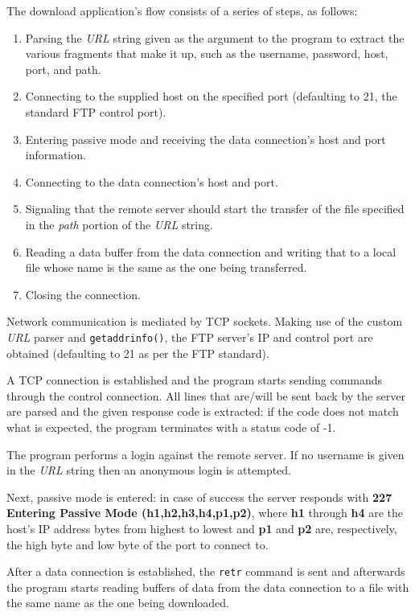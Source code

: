 The download application's flow consists of a series of steps, as follows:

\begin{enumerate}
    \item Parsing the \textit{URL} string given as the argument to the program to extract the various fragments that make it up, such as the username, password, host, port, and path.
    \item Connecting to the supplied host on the specified port (defaulting to 21, the standard FTP control port).
    \item Entering passive mode and receiving the data connection's host and port information.
    \item Connecting to the data connection's host and port.
    \item Signaling that the remote server should start the transfer of the file specified in the \textit{path} portion of the \textit{URL} string.
    \item Reading a data buffer from the data connection and writing that to a local file whose name is the same as the one being transferred.
    \item Closing the connection.
\end{enumerate}

Network communication is mediated by TCP sockets.
Making use of the custom \textit{URL} parser and \lstinline{getaddrinfo()}, the FTP server's IP and control port are obtained (defaulting to 21 as per the FTP standard).

A TCP connection is established and the program starts sending commands through the control connection. All lines that are/will be sent back by the server are parsed and the given response code is extracted: if the code does not match what is expected, the program terminates with a status code of -1.

The program performs a login against the remote server. If no username is given in the \textit{URL} string then an anonymous login is attempted.

Next, passive mode is entered: in case of success the server responds with \textbf{227 Entering Passive Mode (h1,h2,h3,h4,p1,p2)}, where \textbf{h1} through \textbf{h4} are the host's IP address bytes from highest to lowest and \textbf{p1} and \textbf{p2} are, respectively, the high byte and low byte of the port to connect to.

After a data connection is established, the \lstinline{retr} command is sent and afterwards the program starts reading buffers of data from the data connection to a file with the same name as the one being downloaded.

